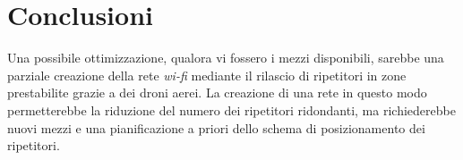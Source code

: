 \chapter{Conclusioni}
Una possibile ottimizzazione, qualora vi fossero i mezzi disponibili, sarebbe una parziale creazione della rete \textit{wi-fi} mediante il rilascio di ripetitori in zone prestabilite grazie a dei droni aerei.
La creazione di una rete in questo modo permetterebbe la riduzione del numero dei ripetitori ridondanti, ma richiederebbe nuovi mezzi e una pianificazione a priori dello schema di posizionamento dei ripetitori.